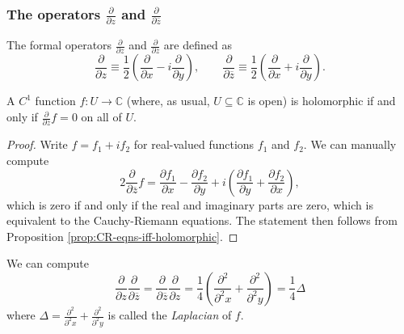 \documentclass[10pt]{article}
\providecommand{\ol}{\overline}
\providecommand{\half}{\frac{1}{2}}
\providecommand{\CC}{\mathbb C}
\providecommand{\vocab}[1]{{{\sffamily\textit{#1}}}}
\begin{document}
\subsubsection{The operators $\frac{\partial}{\partial z}$
and $\frac{\partial}{\partial\ol z}$}
\begin{definition}[$\frac{\partial}{\partial z}$
    and $\frac{\partial}{\partial\ol z}$]
    \label{def:dz-dzbar}
    The formal operators $\frac{\partial}{\partial z}$
    and $\frac{\partial}{\partial\ol z}$ are defined as
    \begin{equation*}
	\frac{\partial}{\partial z}
	\equiv \half\left(\frac{\partial}{\partial x}
	- i\frac{\partial}{\partial y}\right),\qquad
	\frac{\partial}{\partial \ol z}
	\equiv \half\left(\frac{\partial}{\partial x}
	+ i\frac{\partial}{\partial y}\right).
    \end{equation*}
\end{definition}

\begin{prop}
    \label{prop:dzbar-zero-iff-holo}
    A $C^1$ function $f\colon U\to\CC$
    (where, as usual, $U\subseteq\CC$ is open)
    is holomorphic if and only if $\frac\partial{\partial\ol z}f = 0$
    on all of $U$.
\end{prop}

\begin{proof}
    Write $f = f_1 + if_2$ for real-valued functions $f_1$ and $f_2$.
    We can manually compute
    \begin{equation*}
	2\frac\partial{\partial\ol z}f
	= \frac{\partial f_1}{\partial x} - \frac{\partial f_2}{\partial y}
	+ i\left(\frac{\partial f_1}{\partial y}
	+ \frac{\partial f_2}{\partial x}\right),
    \end{equation*}
    which is zero if and only if the real and imaginary parts are zero,
    which is equivalent to the Cauchy-Riemann equations.
    The statement then follows from
    Proposition \ref{prop:CR-eqns-iff-holomorphic}.
\end{proof}

\begin{remark}
    We can compute
    \begin{equation*}
	\frac\partial{\partial z}\frac\partial{\partial\ol z}
	= \frac\partial{\partial\ol z}\frac\partial{\partial z}
	= \frac 14\left(\frac{\partial^2}{\partial^2 x}
	+ \frac{\partial^2}{\partial^2y}\right) = \frac 14\Delta
    \end{equation*}
    where $\Delta = \frac{\partial^2}{\partial^2 x}
    + \frac{\partial^2}{\partial^2y}$ is called the \vocab{Laplacian} of $f$.
\end{remark}
\end{document}
